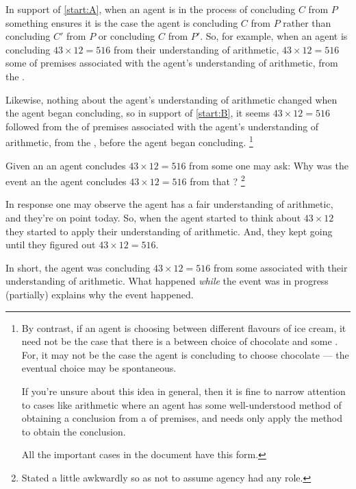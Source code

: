 \begin{note}
  In support of \ref{start:A}, when an agent is in the process of concluding \(C\) from \(P\) something ensures it is the case the agent is concluding \(C\) from \(P\) rather than concluding \(C'\) from \(P\) or concluding \(C\) from \(P'\).
  So, for example, when an agent is concluding \(43 \times 12 = 516\) from their understanding of arithmetic, \(43 \times 12 = 516\) \fof{} some \pool{} of premises associated with the agent's understanding of arithmetic, from the \agpe{}.

  Likewise, nothing about the agent's understanding of arithmetic changed when the agent began concluding, so in support of \ref{start:B}, it seems \(43 \times 12  = 516\) followed from the \pool{} of premises associated with the agent's understanding of arithmetic, from the \agpe{}, before the agent began concluding.%
  \footnote{
    By contrast, if an agent is choosing between different flavours of ice cream, it need not be the case that there is a \fingfr{} between choice of chocolate and some \pool{}.
    For, it may not be the case the agent is concluding to choose chocolate  --- the eventual choice may be spontaneous.

    If you're unsure about this idea in general, then it is fine to narrow attention to cases like arithmetic where an agent has some well-understood method of obtaining a conclusion from a \pool{} of premises, and needs only apply the method to obtain the conclusion.

    All the important cases in the document have this form.
  }
\end{note}


\begin{note}
  Given an \eiw{} an agent concludes \(43 \times 12 = 516\) from some \pool{} one may ask:
  Why was the event an \eiw{} the agent concludes \(43 \times 12 = 516\) from that \pool{}?%
  \footnote{
    Stated a little awkwardly so as not to assume agency had any role.
  }

  In response one may observe the agent has a fair understanding of arithmetic, and they're on point today.
  So, when the agent started to think about \(43 \times 12\) they started to apply their understanding of arithmetic.
  And, they kept going until they figured out \(43 \times 12 = 516\).

  In short, the agent was concluding \(43 \times 12 = 516\) from some \pool{} associated with their understanding of arithmetic.
  What happened \emph{while} the event was in progress (partially) explains why the event happened.
\end{note}


